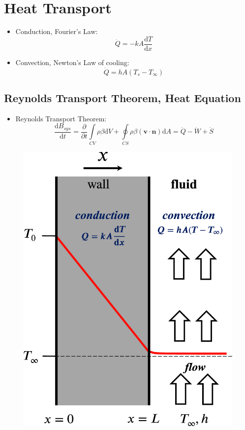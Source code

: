 \documentclass[11pt,a4paper]{article}
\begin{document}
\section{Heat Transport}
\begin{minipage}{.7\textwidth}
\begin{itemize}
    \item Conduction, Fourier's Law: \[\dot{Q}=-kA\frac{\mathrm{d}T}{\mathrm{d}x}\]
    \item Convection, Newton's Law of cooling: \[\dot{Q}=hA(T_{s}-T_{\infty})\]
\end{itemize}
\subsection{Reynolds Transport Theorem, Heat Equation}
\begin{itemize}
    \item Reynolds Transport Theorem: 
    \[
        \frac{\mathrm{d}B_{sys}}{\mathrm{d}t}=\frac{\partial}{\partial t}\int\limits_{CV}\rho \beta \mathrm{d}V+\oint\limits_{CS}\rho\beta(\mathbf{v}\cdot\mathbf{n})\mathrm{d}A = \dot{Q}-\dot{W}+\dot{S}
    \]
\end{itemize}
\end{minipage}
\begin{minipage}{.25\textwidth}
    \begin{figure}[H]
        \includegraphics[width=\textwidth]{conduction-convection.eps}
    \end{figure}
\end{minipage}
\end{document}
